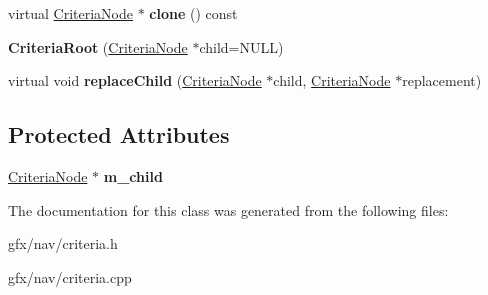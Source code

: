 \begin{DoxyCompactItemize}
\item 
virtual \hyperlink{classCriteriaNode}{Criteria\+Node} $\ast$ {\bfseries clone} () const \hypertarget{classCriteriaRoot_ac963920925d90df6ab7a187de5b06e08}{}\label{classCriteriaRoot_ac963920925d90df6ab7a187de5b06e08}

\item 
{\bfseries Criteria\+Root} (\hyperlink{classCriteriaNode}{Criteria\+Node} $\ast$child=N\+U\+LL)\hypertarget{classCriteriaRoot_aba77ff0c57e2896c30a1b7f71479bf96}{}\label{classCriteriaRoot_aba77ff0c57e2896c30a1b7f71479bf96}

\item 
virtual void {\bfseries replace\+Child} (\hyperlink{classCriteriaNode}{Criteria\+Node} $\ast$child, \hyperlink{classCriteriaNode}{Criteria\+Node} $\ast$replacement)\hypertarget{classCriteriaRoot_a95b8634c5ebd4b07f613caa7d5233caa}{}\label{classCriteriaRoot_a95b8634c5ebd4b07f613caa7d5233caa}

\end{DoxyCompactItemize}
\subsection*{Protected Attributes}
\begin{DoxyCompactItemize}
\item 
\hyperlink{classCriteriaNode}{Criteria\+Node} $\ast$ {\bfseries m\+\_\+child}\hypertarget{classCriteriaRoot_a7ce011d6d71fd64bc7b0f99ae69c9aba}{}\label{classCriteriaRoot_a7ce011d6d71fd64bc7b0f99ae69c9aba}

\end{DoxyCompactItemize}


The documentation for this class was generated from the following files\+:\begin{DoxyCompactItemize}
\item 
gfx/nav/criteria.\+h\item 
gfx/nav/criteria.\+cpp\end{DoxyCompactItemize}
